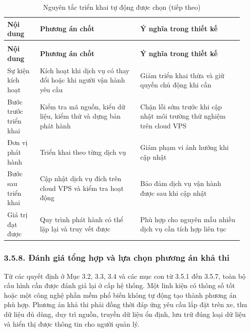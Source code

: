 \documentclass[a4paper]{extarticle}
\newcommand{\thesissettableid}[2]{%
  \renewcommand{\thetable}{#1}%
  \renewcommand{\theHtable}{#2}%
}
\begin{document}
{\thesissettableid{3.42}{condensed-bang-3-42-nguyen-tac-trien-khai-tu-dong-duoc-chon}
\def\LTcaptype{table}
\begin{longtable}{|L{0.134\linewidth}|L{0.407\linewidth}|L{0.417\linewidth}|}
\caption{Nguyên tắc triển khai tự động được chọn}\label{tab:condensed-bang-3-42-nguyen-tac-trien-khai-tu-dong-duoc-chon}\\
\hline
\textbf{Nội dung} & \textbf{Phương án chốt} & \textbf{Ý nghĩa trong thiết kế} \\
\hline
\endfirsthead
\caption[]{Nguyên tắc triển khai tự động được chọn (tiếp theo)}\\
\hline
\textbf{Nội dung} & \textbf{Phương án chốt} & \textbf{Ý nghĩa trong thiết kế} \\
\hline
\endhead
\endfoot
\endlastfoot
Sự kiện kích hoạt & Kích hoạt khi dịch vụ có thay đổi hoặc khi người vận hành yêu cầu & Giảm triển khai thừa và giữ quyền chủ động khi cần \\\hline
Bước trước triển khai & Kiểm tra mã nguồn, kiểu dữ liệu, kiểm thử và dựng bản phát hành & Chặn lỗi sớm trước khi cập nhật môi trường thử nghiệm trên cloud VPS \\\hline
Đơn vị phát hành & Triển khai theo từng dịch vụ & Giảm phạm vi ảnh hưởng khi cập nhật \\\hline
Bước sau triển khai & Cập nhật dịch vụ đích trên cloud VPS và kiểm tra hoạt động & Bảo đảm dịch vụ vận hành được sau khi cập nhật \\\hline
Giá trị đạt được & Quy trình phát hành có thể lặp lại và truy vết được & Phù hợp cho nguyên mẫu nhiều dịch vụ cần tích hợp liên tục \\\hline
\end{longtable}
}

\subsubsection{3.5.8. Đánh giá tổng hợp và lựa chọn phương án khả thi}\label{ux111uxe1nh-giuxe1-tux1ed5ng-hux1ee3p-vuxe0-lux1ef1a-chux1ecdn-phux1b0ux1a1ng-uxe1n-khux1ea3-thi}

Từ các quyết định ở Mục 3.2, 3.3, 3.4 và các mục con từ 3.5.1 đến 3.5.7, toàn
bộ cấu hình cần được đánh giá lại ở cấp hệ thống. Một linh kiện có thông số tốt
hoặc một công nghệ phần mềm phổ biến không tự động tạo thành phương án phù hợp.
Phương án khả thi phải đồng thời đáp ứng yêu cầu lắp đặt trên xe, thu dữ liệu đủ
dùng, duy trì nguồn, truyền dữ liệu ổn định, lưu trữ đúng loại dữ liệu và hiển
thị được thông tin cho người quản lý.
\end{document}

